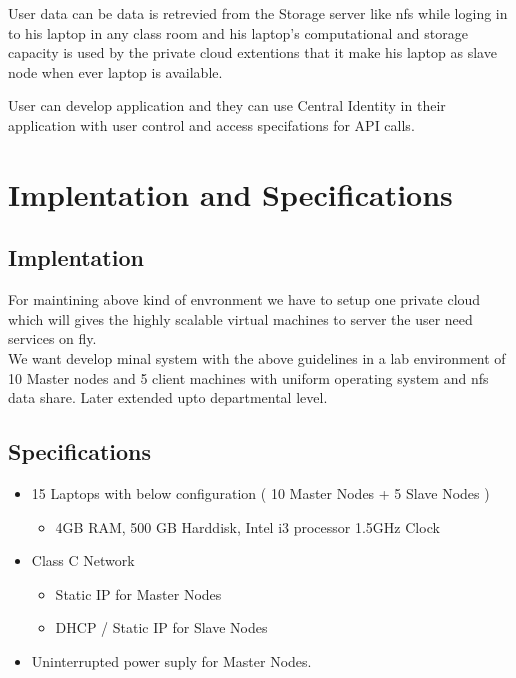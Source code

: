 \documentclass[12pt]{report}
\begin{document}
	User data can be data is retrevied from the Storage server like nfs while loging in to his laptop in any class room and his laptop's computational and storage capacity is used by the private cloud extentions that it make his laptop as slave node when ever laptop is available.\newline 
	
	User can develop application and they can use Central Identity in their application with user control and access specifations for API calls. \newline
	
\chapter{Implentation and Specifications}

\section{Implentation}

	For maintining above kind of envronment we have to setup one private cloud which will gives the highly scalable virtual machines to server the user need services on fly.\\
	
	We want develop minal system with the above guidelines in a lab environment of 10 Master nodes and 5 client machines with uniform operating system and nfs data share. Later extended upto departmental level.
	
	
\section{Specifications}

	\begin{itemize}
		\item 15 Laptops with below configuration ( 10 Master Nodes + 5 Slave Nodes )
			\begin{itemize}
				\item 4GB RAM, 500 GB Harddisk, Intel i3 processor 1.5GHz Clock
			\end{itemize}
		
		\item Class C Network 
			\begin{itemize}
			 	\item Static IP for Master Nodes
			 	\item DHCP / Static IP for Slave Nodes
			\end{itemize}
			
		\item Uninterrupted power suply for Master Nodes.
		
	\end{itemize}
	
\end{document}

